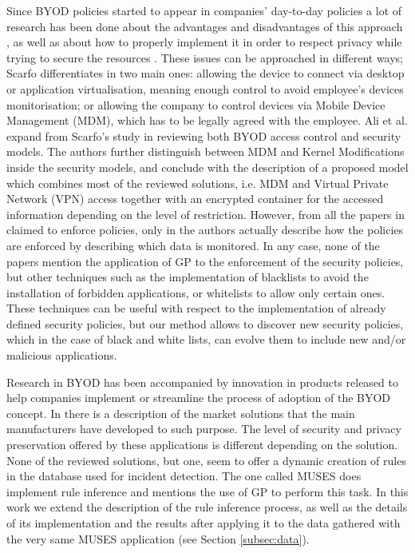 \documentclass[a4paper,10pt,twocolumn,preprint,3p]{elsarticle}
\begin{document}
Since BYOD policies started to appear in companies' day-to-day policies  a lot
of research has been done about the advantages and disadvantages of
this approach \cite{singh2012byod}, as well as about how to properly implement it in order to
respect privacy while trying to secure the resources \cite{scarfo2012new, ali2015analysis, de2015corporate}.
These issues can be approached in different ways; Scarfo
differentiates in \cite{scarfo2012new} two main ones: allowing the
device to connect via desktop or application virtualisation, meaning
enough control to avoid employee's devices monitorisation; or allowing
the company to control devices
via Mobile Device Management (MDM), which has to be legally agreed
with the employee. %
 Ali et al. expand from Scarfo's study in
\cite{ali2015analysis} reviewing both BYOD access control
 and security models. The authors further distinguish
between MDM and Kernel Modifications inside the security models, and
conclude with the description of a proposed model which combines most
of the reviewed solutions, i.e. MDM and Virtual Private Network (VPN)
access together with an encrypted container for the accessed
information depending on the level of restriction. However, from all
the papers in \cite{ali2015analysis} claimed to enforce policies, only
in \cite{rhee2013high} the authors actually describe how the policies
are enforced by describing which data is monitored. In any case, none
of the papers mention the application of GP to the enforcement of the
security policies, but other techniques such as the implementation of
blacklists to avoid the installation of forbidden applications, or
whitelists to allow only certain ones. These techniques can be useful
with respect to the implementation of already defined security
policies, but our method allows to discover new security policies,
which in the case of black and white lists, can evolve them to include
new and/or malicious applications. 

Research in BYOD has been accompanied by innovation in products released
to help companies implement or streamline the process of adoption of the BYOD
concept. In \cite{de2015corporate} there is a description of the
market solutions that the main manufacturers have developed to such
purpose. The level of security and privacy preservation offered by
these applications is different depending on the solution.
None of the reviewed solutions, but one, seem to offer a dynamic creation of rules in the database used for incident detection. The one called MUSES does implement rule inference and mentions the use of GP to perform this task. In this work we extend the description of the rule inference process, as well as the details of its implementation and the results after applying it to the data gathered with the very same MUSES application (see Section \ref{subsec:data}).
\end{document}
